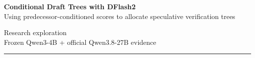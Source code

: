 \documentclass[9pt,landscape]{article}
\begin{document}
\color{ink}

\begin{minipage}[t]{0.73\textwidth}
  {\fontsize{20}{22}\selectfont\bfseries Conditional Draft Trees with DFlash2}\\[-1pt]
  {\fontsize{10.5}{12}\selectfont\color{muted}
  Using predecessor-conditioned scores to allocate speculative verification trees}
\end{minipage}
\hfill
\begin{minipage}[t]{0.25\textwidth}
  \raggedleft\footnotesize
  Research exploration\\
  Frozen Qwen3-4B + official Qwen3.8-27B evidence
\end{minipage}

\vspace{2pt}\hrule\vspace{5pt}
\end{document}

